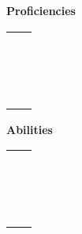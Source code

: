 \documentclass[green]{grimrock}
\begin{document}
\name{\gTalents{}}

{\bf Proficiencies}
\begin{table}[h]
\begin{tabular}{lp{13cm}}
{\bf \swordsa{}} &\swordsa{\MYtext}\\
{\bf \swordsb{}} &\swordsb{\MYtext}\\
{\bf \swordSpeed{}} &\swordSpeed{\MYtext}\\
{\bf \axea{}} &\axea{\MYtext}\\
{\bf \axeb{}} &\axeb{\MYtext}\\
{\bf \axeDam{}} &\axeDam{\MYtext}\\
{\bf \rangedb{}} &\rangedb{\MYtext}\\
{\bf \throwa{}} &\throwa{\MYtext}\\
{\bf \throwb{}} &\throwb{\MYtext}\\
{\bf \firea{}} &\firea{\MYtext}\\
{\bf \fireb{}} &\fireb{\MYtext}\\
{\bf \lightninga{}} &\lightninga{\MYtext}\\
{\bf \lightningb{}} &\lightningb{\MYtext}\\
{\bf \eartha{}} &\eartha{\MYtext}\\
{\bf \earhtb{}} &\earhtb{\MYtext}\\
{\bf \armor{}} &\armor{\MYtext}\\
\end{tabular}
\end{table}

{\bf Abilities}
\begin{table}[h]
\begin{tabular}{lp{13cm}}
{\bf \sack{}} &\sack{\MYtext}\\
{\bf \hp{}} &\hp{\MYtext}\\
{\bf \levitate{}} &\levitate{\MYtext}\\
{\bf \hpTransfer{}} &\hpTransfer{\MYtext}\\
{\bf \mem{}} &\mem{\MYtext}\\
{\bf \daze{}} &\daze{\MYtext}\\
{\bf \alchemy{}} &\alchemy{\MYtext}\\
{\bf \push{}} &\push{\MYtext}\\
{\bf \fireres{}} &\fireres{\MYtext}\\
{\bf \lightres{}} &\lightres{\MYtext}\\
{\bf \poires{}} &\poires{\MYtext}\\
{\bf \ammo{}} &\ammo{\MYtext}\\
{\bf \guard{}} &\guard{\MYtext}\\
{\bf \dodge{}} &\dodge{\MYtext}\\
{\bf \extraheal{}} &\extraheal{\MYtext}\\
{\bf \extraspeed{}} &\extraspeed{\MYtext}\\
\end{tabular}
\end{table}
\end{document}
